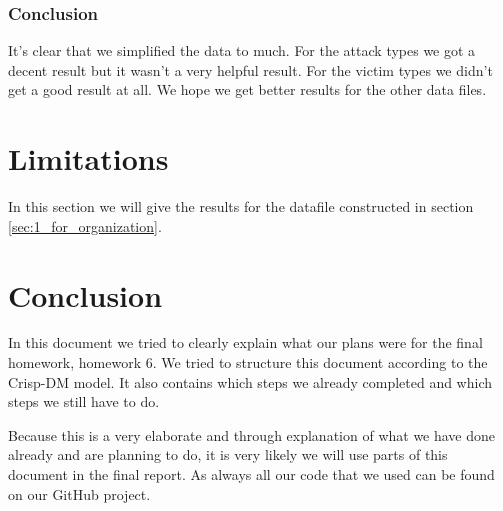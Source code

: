 \documentclass[a4]{article}
\begin{document}
\subsubsection{Conclusion}
It's clear that we simplified the data to much. For the attack types we got a decent result but it wasn't a very helpful result. For the victim types we didn't get a good result at all. We hope we get better results for the other data files.
\section{Limitations}
In this section we will give the results for the datafile constructed in section \ref{sec:1_for_organization}.
\label{sec:limitations}
\section{Conclusion}
\label{sec:conclusion}
In this document we tried to clearly explain what our plans were for the final homework, homework 6. We tried to structure this document according to the Crisp-DM model. It also contains which steps we already completed and which steps we still have to do.\par
Because this is a very elaborate and through explanation of what we have done already and are planning to do, it is very likely we will use parts of this document in the final report. As always all our code that we used can be found on our GitHub project\cite{githubproject}.
\printbibliography
\end{document}
